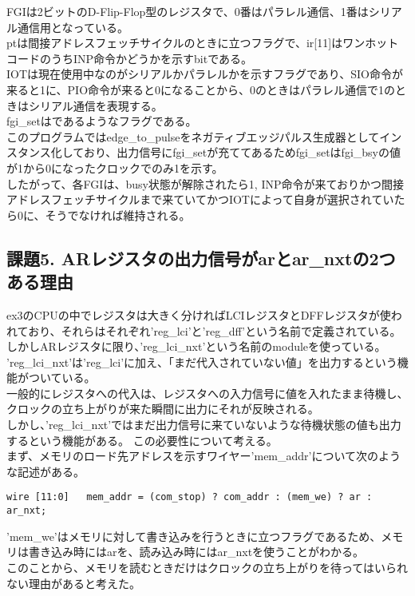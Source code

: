 \documentclass{jsarticle}
\begin{document}
FGIは2ビットのD-Flip-Flop型のレジスタで、0番はパラレル通信、1番はシリアル通信用となっている。\\
ptは間接アドレスフェッチサイクルのときに立つフラグで、ir[11]はワンホットコードのうちINP命令かどうかを示すbitである。\\
IOTは現在使用中なのがシリアルかパラレルかを示すフラグであり、SIO命令が来ると1に、PIO命令が来ると0になることから、0のときはパラレル通信で1のときはシリアル通信を表現する。\\
fgi\_setはであるようなフラグである。\\
このプログラムではedge\_to\_pulseをネガティブエッジパルス生成器としてインスタンス化しており、出力信号にfgi\_setが充ててあるためfgi\_setはfgi\_bsyの値が1から0になったクロックでのみ1を示す。\\

したがって、各FGIは、busy状態が解除されたら1, INP命令が来ておりかつ間接アドレスフェッチサイクルまで来ていてかつIOTによって自身が選択されていたら0に、そうでなければ維持される。

\subsection*{課題5. ARレジスタの出力信号がarとar\_nxtの2つある理由}
ex3のCPUの中でレジスタは大きく分ければLCIレジスタとDFFレジスタが使われており、それらはそれぞれ'reg\_lci'と'reg\_dff'という名前で定義されている。\\
しかしARレジスタに限り、'reg\_lci\_nxt'という名前のmoduleを使っている。\\
'reg\_lci\_nxt'は'reg\_lci'に加え、「まだ代入されていない値」を出力するという機能がついている。\\

一般的にレジスタへの代入は、レジスタへの入力信号に値を入れたまま待機し、クロックの立ち上がりが来た瞬間に出力にそれが反映される。\\
しかし、'reg\_lci\_nxt'ではまだ出力信号に来ていないような待機状態の値も出力するという機能がある。 この必要性について考える。\\

まず、メモリのロード先アドレスを示すワイヤー'mem\_addr'について次のような記述がある。
\begin{lstlisting}
wire [11:0]   mem_addr = (com_stop) ? com_addr : (mem_we) ? ar : ar_nxt;
\end{lstlisting}
'mem\_we'はメモリに対して書き込みを行うときに立つフラグであるため、メモリは書き込み時にはarを、読み込み時にはar\_nxtを使うことがわかる。\\
このことから、メモリを読むときだけはクロックの立ち上がりを待ってはいられない理由があると考えた。\\
\end{document}
